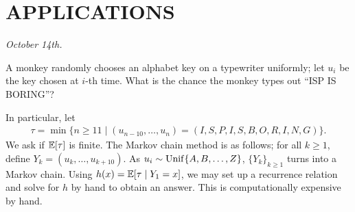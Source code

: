 \chapter{APPLICATIONS}


\textit{October 14th.}

\begin{example}
    A monkey randomly chooses an alphabet key on a typewriter uniformly; let $u_{i}$ be the key chosen at $i$-th time. What is the chance the monkey types out ``ISP IS BORING''?
\end{example}
In particular, let
\begin{align}
    \tau = \min\{n \geq 11 \mid (u_{n-10},\ldots,u_{n}) = (I,S,P,I,S,B,O,R,I,N,G)\}.
\end{align}
We ask if $\mathbb{E}[\tau]$ is finite. The Markov chain method is as follows; for all $k \geq 1$, define $Y_{k} = (u_{k},\ldots,u_{k+10})$. As $u_{i} \sim \operatorname{Unif}\{A,B,\ldots,Z\}$, $\{Y_{k}\}_{k \geq 1}$ turns into a Markov chain. Using $h(x) = \mathbb{E}[\tau \mid Y_{1} = x]$, we may set up a recurrence relation and solve for $h$ by hand to obtain an answer. This is computationally expensive by hand.

